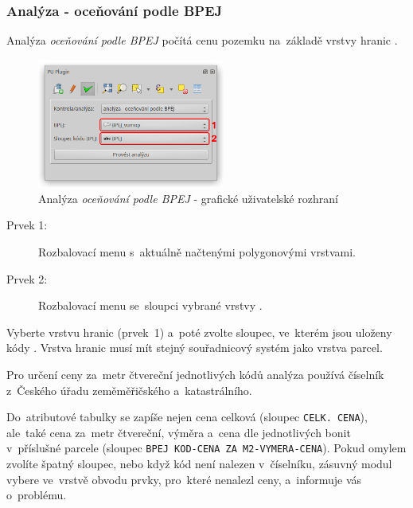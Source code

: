 \subsubsection{Analýza - oceňování podle BPEJ}
\label{manual_analyza_bpej}

Analýza \textit{oceňování podle BPEJ} počítá cenu pozemku na~základě vrstvy hranic .

	\begin{figure}[H]
		\centering
		\includegraphics[width=0.55\textwidth]{./pictures/analyza_bpej.png}
		\caption[Analýza \textit{oceňování podle BPEJ} - grafické uživatelské rozhraní]{Analýza \textit{oceňování podle BPEJ} - grafické uživatelské rozhraní}
		\label{fig:manual_analyza_bpej_gui}
 	\end{figure}

\begin{description}
	\item[Prvek 1:] Rozbalovací menu s~aktuálně načtenými polygonovými vrstvami.
	\item[Prvek 2:] Rozbalovací menu se~sloupci vybrané vrstvy .
\end{description}

Vyberte vrstvu hranic  (prvek~1) a~poté zvolte sloupec, ve~kterém jsou uloženy kódy . Vrstva hranic  musí mít stejný souřadnicový systém jako vrstva parcel.

Pro určení ceny za~metr čtvereční jednotlivých kódů  analýza používá číselník  z~Českého úřadu zeměměřičského a~katastrálního.

Do~atributové tabulky se zapíše nejen cena celková (sloupec \texttt{CELK. CENA}), ale~také cena za~metr čtvereční, výměra a~cena dle jednotlivých bonit v~příslušné parcele (sloupec \texttt{BPEJ KOD-CENA ZA M2-VYMERA-CENA}). Pokud omylem zvolíte špatný slou\-pec, nebo když kód  není nalezen v~číselníku, zásuvný modul vybere ve~vrstvě obvodu prvky, pro~které nenalezl ceny, a~informuje vás o~problému.
